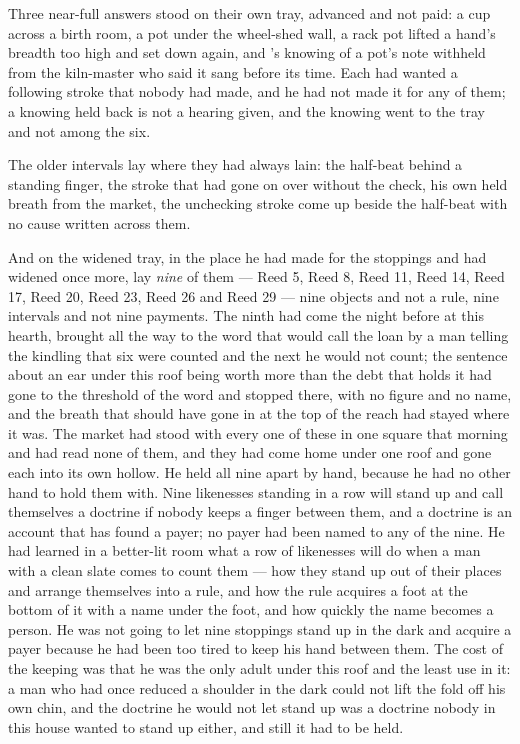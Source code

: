 Three near-full answers stood on their own tray, advanced and not paid: a cup across a birth room, a pot under the wheel-shed wall, a rack pot lifted a hand's breadth too high and set down again, and 's knowing of a pot's note withheld from the kiln-master who said it sang before its time. Each had wanted a following stroke that nobody had made, and he had not made it for any of them; a knowing held back is not a hearing given, and the knowing went to the tray and not among the six.

The older intervals lay where they had always lain: the half-beat behind a standing finger, the stroke that had gone on over  without the check, his own held breath from the market, the unchecking stroke come up beside the half-beat with no cause written across them.

And on the widened tray, in the place he had made for the stoppings and had widened once more, lay \emph{nine} of them --- Reed 5, Reed 8, Reed 11, Reed 14, Reed 17, Reed 20, Reed 23, Reed 26 and Reed 29 --- nine objects and not a rule, nine intervals and not nine payments. The ninth had come the night before at this hearth, brought all the way to the word that would call the loan by a man telling the kindling that six were counted and the next he would not count; the sentence about an ear under this roof being worth more than the debt that holds it had gone to the threshold of the word and stopped there, with no figure and no name, and the breath that should have gone in at the top of the reach had stayed where it was. The market had stood with every one of these in one square that morning and had read none of them, and they had come home under one roof and gone each into its own hollow. He held all nine apart by hand, because he had no other hand to hold them with. Nine likenesses standing in a row will stand up and call themselves a doctrine if nobody keeps a finger between them, and a doctrine is an account that has found a payer; no payer had been named to any of the nine. He had learned in a better-lit room what a row of likenesses will do when a man with a clean slate comes to count them --- how they stand up out of their places and arrange themselves into a rule, and how the rule acquires a foot at the bottom of it with a name under the foot, and how quickly the name becomes a person. He was not going to let nine stoppings stand up in the dark and acquire a payer because he had been too tired to keep his hand between them. The cost of the keeping was that he was the only adult under this roof and the least use in it: a man who had once reduced a shoulder in the dark could not lift the fold off his own chin, and the doctrine he would not let stand up was a doctrine nobody in this house wanted to stand up either, and still it had to be held.

